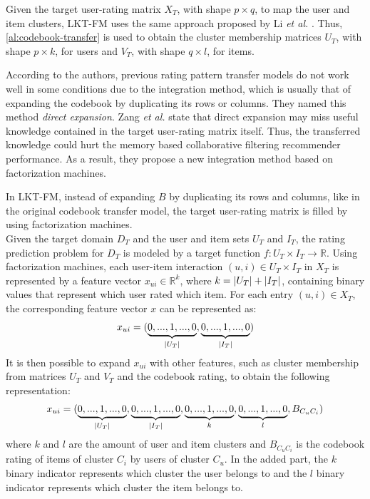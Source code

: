 Given the target user-rating matrix $X_T$, with shape $p \times q$, to map the user and item clusters, LKT-FM uses the same approach proposed by Li \textit{et al.} \cite{10.5555/1661445.1661773}. Thus, \autoref{al:codebook-transfer} is used to obtain the cluster membership matrices $U_T$, with shape $p \times k$, for users and $V_T$, with shape $q \times l$, for items.\par
According to the authors, previous rating pattern transfer models do not work well in some conditions due to the integration method, which is usually that of expanding the codebook by duplicating its rows or columns. They named this method \textit{direct expansion}. Zang \textit{et al.} state that direct expansion may miss useful knowledge contained in the target user-rating matrix itself. Thus, the transferred knowledge could hurt the memory based collaborative filtering recommender performance. As a result, they propose a new integration method based on factorization machines.\par
In LKT-FM, instead of expanding $B$ by duplicating its rows and columns, like in the original codebook transfer model, the target user-rating matrix is filled by using factorization machines.\\
Given the target domain $D_T$ and the user and item sets $U_T$ and $I_T$, the rating prediction problem for $D_T$ is modeled by a target function $f: U_T \times I_T \rightarrow \mathbb{R}$. Using factorization machines, each user-item interaction $(u,i) \in U_T \times I_T$ in $X_T$ is represented by a feature vector $x_{ui} \in \mathbb{R}^k$, where $k = \left\lvert U_T\right\rvert + \left\lvert I_T\right\rvert$, containing binary values that represent which user rated which item. For each entry $(u,i) \in X_T$, the corresponding feature vector $x$ can be represented as:
\begin{equation}
x_{ui} = (\underbrace{0,...,1,...,0}_{\left\lvert U_T\right\rvert},\underbrace{0,...,1,...,0}_{\left\lvert I_T\right\rvert})
\end{equation}
It is then possible to expand $x_{ui}$ with other features, such as cluster membership from matrices $U_T$ and $V_T$ and the codebook rating, to obtain the following representation:
\begin{equation}
x_{ui} = (\underbrace{0,...,1,...,0}_{\left\lvert U_T\right\rvert},\underbrace{0,...,1,...,0}_{\left\lvert I_T\right\rvert},\underbrace{0,...,1,...,0}_{k},\underbrace{0,...,1,...,0}_{l},B_{C_uC_i})
\end{equation}
where $k$ and $l$ are the amount of user and item clusters and $B_{C_uC_i}$ is the codebook rating of items of cluster $C_i$ by users of cluster $C_u$. In the added part, the $k$ binary indicator represents which cluster the user belongs to and the $l$ binary indicator represents which cluster the item belongs to.\\
